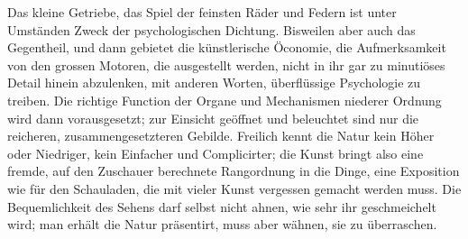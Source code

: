 Das kleine Getriebe, das Spiel der feinsten Räder und Federn ist unter Umständen Zweck der psychologischen Dichtung. Bisweilen aber auch das Gegentheil, und dann gebietet die künstlerische Öconomie, die Aufmerksamkeit von den grossen Motoren, die ausgestellt werden, nicht in ihr gar zu minutiöses Detail hinein abzulenken, mit anderen Worten,  überflüssige Psychologie zu treiben. Die richtige Function der Organe und Mechanismen niederer Ordnung wird dann vorausgesetzt; zur Einsicht geöffnet und beleuchtet sind nur die reicheren, zusammengesetzteren Gebilde. Freilich kennt die Natur kein Höher oder Niedriger, kein Einfacher und Complicirter; die Kunst bringt also eine fremde, auf den Zuschauer berechnete Rangordnung in die Dinge, eine Exposition wie für den Schauladen, die mit vieler Kunst vergessen gemacht werden muss. Die Bequemlichkeit des Sehens darf selbst nicht ahnen, wie sehr ihr geschmeichelt wird; man erhält die Natur präsentirt, muss aber wähnen, sie zu überraschen.
\par

